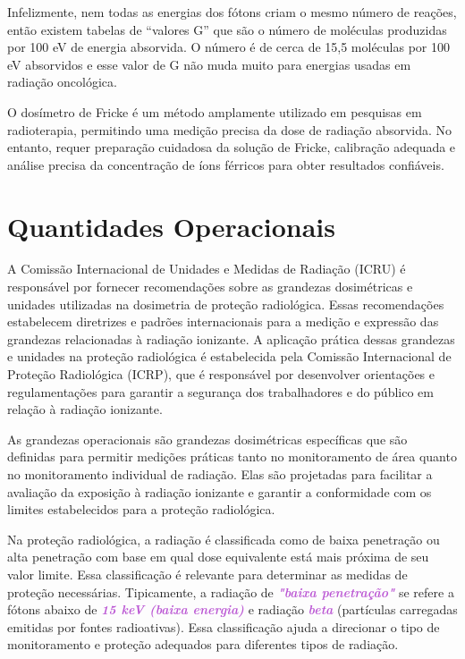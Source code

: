 \documentclass[11pt,a4paper]{article}
\begin{document}
		Infelizmente, nem todas as energias dos fótons criam o mesmo número de reações, então existem tabelas de “valores G” que são o número de moléculas produzidas por 100 eV de energia absorvida. O número é de cerca de 15,5 moléculas por 100 eV absorvidos e esse valor de G não muda muito para energias usadas em radiação oncológica.

		O dosímetro de Fricke é um método amplamente utilizado em pesquisas em radioterapia, permitindo uma medição precisa da dose de radiação absorvida. No entanto, requer preparação cuidadosa da solução de Fricke, calibração adequada e análise precisa da concentração de íons férricos para obter resultados confiáveis.

\section{Quantidades Operacionais}

	A Comissão Internacional de Unidades e Medidas de Radiação (ICRU) é responsável por fornecer recomendações sobre as grandezas dosimétricas e unidades utilizadas na dosimetria de proteção radiológica. Essas recomendações estabelecem diretrizes e padrões internacionais para a medição e expressão das grandezas relacionadas à radiação ionizante. A aplicação prática dessas grandezas e unidades na proteção radiológica é estabelecida pela Comissão Internacional de Proteção Radiológica (ICRP), que é responsável por desenvolver orientações e regulamentações para garantir a segurança dos trabalhadores e do público em relação à radiação ionizante.

	As grandezas operacionais são grandezas dosimétricas específicas que são definidas para permitir medições práticas tanto no monitoramento de área quanto no monitoramento individual de radiação. Elas são projetadas para facilitar a avaliação da exposição à radiação ionizante e garantir a conformidade com os limites estabelecidos para a proteção radiológica.

	Na proteção radiológica, a radiação é classificada como de baixa penetração ou alta penetração com base em qual dose equivalente está mais próxima de seu valor limite. Essa classificação é relevante para determinar as medidas de proteção necessárias. Tipicamente, a radiação de \textcolor{MediumOrchid}{\textit{\textbf{"baixa penetração"}}} se refere a fótons abaixo de \textcolor{MediumOrchid}{\textit{\textbf{15 keV (baixa energia)}}} e radiação \textcolor{MediumOrchid}{\textit{\textbf{beta}}} (partículas carregadas emitidas por fontes radioativas). Essa classificação ajuda a direcionar o tipo de monitoramento e proteção adequados para diferentes tipos de radiação.
\end{document}
